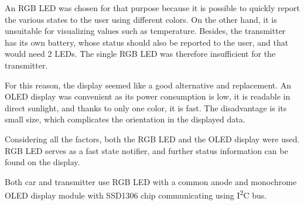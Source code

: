 An RGB LED was chosen for that purpose because it is possible to quickly report the various states to the user using different colors. On the other hand, it is unsuitable for visualizing values such as temperature. Besides, the transmitter has its own battery, whose status should also be reported to the user, and that would need 2 LEDs. The single RGB LED was therefore insufficient for the transmitter.

For this reason, the display seemed like a good alternative and replacement. An OLED display was convenient as its power consumption is low, it is readable in direct sunlight, and thanks to only one color, it is fast. The disadvantage is its small size, which complicates the orientation in the displayed data.

Considering all the factors, both the RGB LED and the OLED display were used. RGB LED serves as a fast state notifier, and further status information can be found on the display.

Both car and transmitter use RGB LED with a common anode and monochrome OLED display module with SSD1306 chip communicating using I\textsuperscript{2}C bus. %



